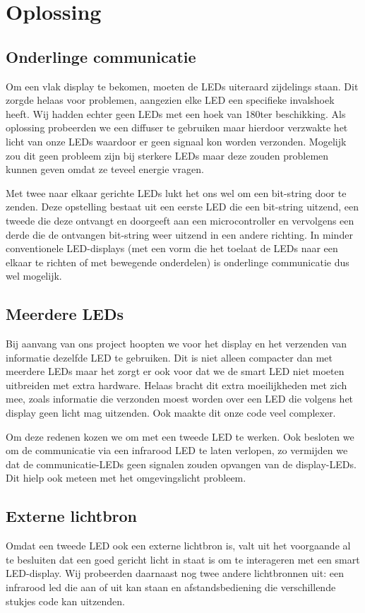 \documentclass{article}
\begin{document}
\section{Oplossing}

\subsection{Onderlinge communicatie}
Om een vlak display te bekomen, moeten de LEDs uiteraard zijdelings staan. Dit zorgde helaas voor problemen, aangezien elke LED een specifieke invalshoek heeft. Wij hadden echter geen LEDs met een hoek van 180\degree ter beschikking. Als oplossing probeerden we een diffuser te gebruiken maar hierdoor verzwakte het licht van onze LEDs waardoor er geen signaal kon worden verzonden. Mogelijk zou dit geen probleem zijn bij sterkere LEDs maar deze zouden problemen kunnen geven omdat ze teveel energie vragen. 

Met twee naar elkaar gerichte LEDs lukt het ons wel om een bit-string door te zenden. Deze opstelling bestaat uit een eerste LED die een bit-string uitzend, een tweede die deze ontvangt en doorgeeft aan een microcontroller en vervolgens een derde die de ontvangen bit-string weer uitzend in een andere richting. In minder conventionele LED-displays (met een vorm die het toelaat de LEDs naar een elkaar te richten of met bewegende onderdelen) is onderlinge communicatie dus wel mogelijk.

\subsection{Meerdere LEDs}
Bij aanvang van ons project hoopten we voor het display en het verzenden van informatie dezelfde LED te gebruiken. Dit is niet alleen compacter dan met meerdere LEDs maar het zorgt er ook voor dat we de smart LED niet moeten uitbreiden met extra hardware. Helaas bracht dit extra moeilijkheden met zich mee, zoals informatie die verzonden moest worden over een LED die volgens het display geen licht mag uitzenden. Ook maakte dit onze code veel complexer. 

Om deze redenen kozen we om met een tweede LED te werken. Ook besloten we om de communicatie via een infrarood LED te laten verlopen, zo vermijden we dat de communicatie-LEDs geen signalen zouden opvangen van de display-LEDs. Dit hielp ook meteen met het omgevingslicht probleem. 

\subsection{Externe lichtbron}
Omdat een tweede LED ook een externe lichtbron is, valt uit het voorgaande al te besluiten dat een goed gericht licht in staat is om te interageren met een smart LED-display. Wij probeerden daarnaast nog twee andere lichtbronnen uit: een infrarood led die aan of uit kan staan en afstandsbediening die verschillende stukjes code kan uitzenden.
\end{document}
